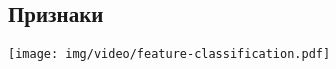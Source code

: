\subsection{Признаки}

\begin{frame}{}
    \begin{center}
        \texttt{[image: img/video/feature-classification.pdf]}
    \end{center}
\end{frame}
